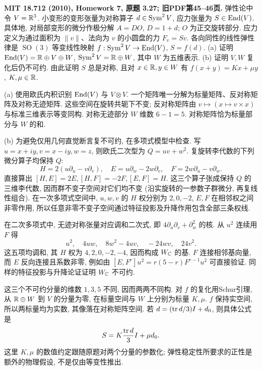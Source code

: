 \begin{exercise}\label{hw:3.27}
\textbf{MIT 18.712 (2010), Homework 7, 原题 3.27; 旧PDF第45--46页.}
弹性论中令 $V=\mathbb R^3$. 小变形的变形张量为对称算子 $d\in\operatorname{Sym}^2V$, 应力张量为 $S\in\operatorname{End}(V)$. 具体地, 对局部变形的微分作极分解 $A=DO$, $D=1+d$; $O$ 为正交旋转部分. 应力定义为通过面积为 $\|v\|$、法向为 $v$ 的小圆盘的力 $F_v=Sv$. 各向同性的线性弹性律是 $\operatorname{SO}(3)$ 等变线性映射 $f:\operatorname{Sym}^2V\to\operatorname{End}(V)$, $S=f(d)$.
(a) 证明 $\operatorname{End}(V)=\mathbb R\oplus V\oplus W$, $\operatorname{Sym}^2V=\mathbb R\oplus W$, 其中 $W$ 为五维表示.
(b) 证明 $V,W$ 复化后仍不可约. 由此证明 $S$ 总是对称, 且对 $x\in\mathbb R,y\in W$ 有 $f(x+y)=Kx+\mu y$, $K,\mu\in\mathbb R$.
\end{exercise}
\begin{solution}
(a) 使用欧氏内积识别 $\operatorname{End}(V)$ 与 $V\otimes V$. 一个矩阵唯一分解为标量矩阵、反对称矩阵及对称无迹矩阵. 这些空间在旋转共轭下不变; 反对称矩阵由 $v\mapsto(x\mapsto v\times x)$ 与标准三维表示等变同构. 对称无迹部分 $W$ 维数 $6-1=5$. 对称矩阵恰为标量部分与 $W$ 的和.

(b) 为避免仅用几何直觉断言复不可约, 在多项式模型中检查. 写 $u=x+iy,v=x-iy,w=z$, 则欧氏二次型为 $Q=uv+w^2$. 复旋转李代数的下列微分算子均保持 $Q$:
\[
 H=2(u\partial_u-v\partial_v),\quad
 E=u\partial_w-2w\partial_v,\quad
 F=2w\partial_u-v\partial_w.
\]
直接算出 $[H,E]=2E,[H,F]=-2F,[E,F]=H$. 这三个算子张成保持 $Q$ 的三维李代数, 因而群不变子空间对它们均不变 (沿实旋转的一参数子群微分, 再复线性组合). 在一次多项式空间中, $u,w,v$ 的 $H$ 权分别为 $2,0,-2$, $E,F$ 在相邻权之间非零作用, 所以任意非零不变子空间通过特征投影及升降作用包含全部三条权线.

在二次多项式中, 无迹对称张量对应调和二次式, 即 $4\partial_u\partial_v+\partial_w^2$ 的核. 从 $u^2$ 连续用 $F$ 得
\[
 u^2,\quad4uw,\quad8w^2-4uv,\quad-24wv,\quad24v^2.
\]
这五项均调和, 其 $H$ 权为 $4,2,0,-2,-4$, 因而构成 $W_\mathbb C$ 的基. $F$ 连接相邻基向量, 而 $E$ 反向连接且系数非零, 例如由 $[E,F^r]u^2=r(5-r)F^{r-1}u^2$ 可直接验证. 同样的特征投影与升降论证证明 $W_\mathbb C$ 不可约.

这三个不可约分量的维数 $1,3,5$ 不同, 因而两两不同构. 对 $f$ 的复化用Schur引理, 从 $\mathbb R\oplus W$ 到 $V$ 的分量为零, 在标量空间与 $W$ 上分别为标量 $K,\mu$. $f$ 保持实空间, 所以两标量均为实数, 其像落在对称矩阵空间. 若 $d=(\operatorname{tr} d/3)I+d_0$, 则具体公式是
\[
 S=K\frac{\operatorname{tr} d}{3}I+\mu d_0.
\]
这里 $K,\mu$ 的数值约定跟随原题对两个分量的参数化; 弹性稳定性所要求的正性是额外的物理假设, 不是仅由等变性推出.
\end{solution}


